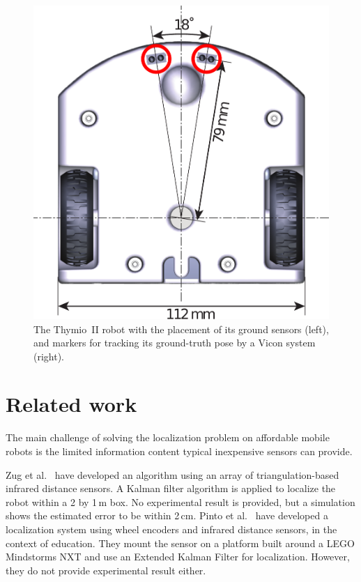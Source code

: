 \documentclass[letterpaper, 10pt, conference]{ieeeconf}
\begin{document}
\begin{figure}
\includegraphics[width=.43\columnwidth]{thymio2-dimensions}\hfill
{}
\vspace{-.07cm}
\caption{The Thymio~II robot with the placement of its ground sensors (left), and markers for tracking its ground-truth pose by a Vicon system (right).}
\label{fig:thymio}
\end{figure}

\section{Related work}

The main challenge of solving the localization problem on affordable mobile robots is the limited information content typical inexpensive sensors can provide.

Zug et al.~\cite{zug2011design} have developed an algorithm using an array of triangulation-based infrared distance sensors.
A Kalman filter algorithm is applied to localize the robot within a 2 by 1\,m box.
No experimental result is provided, but a simulation shows the estimated error to be within 2\,cm.
Pinto et al.~\cite{pinto2012localization} have developed a localization system using wheel encoders and infrared distance sensors, in the context of education.
They mount the sensor on a platform built around a LEGO Mindstorms NXT and use an Extended Kalman Filter for localization.
However, they do not provide experimental result either.
\end{document}
